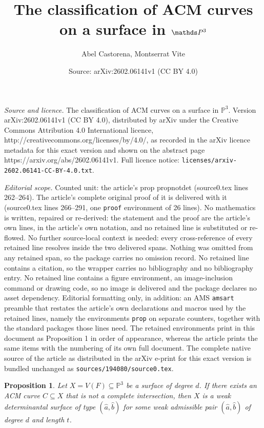 \documentclass[10pt,a4paper]{amsart}
\title{The classification of ACM curves on a surface in $\PPP$}
\author{Abel Castorena, Montserrat Vite}
\date{Source: arXiv:2602.06141v1 (CC BY 4.0)}
\newtheorem{prop}{Proposition}
\newcommand{\PP}{\mathds{P}}
\newcommand{\PPP}{\PP^{3}}
\begin{document}
\maketitle

\noindent\emph{Source and licence.} The classification of ACM curves on a surface in $\PPP$. Version arXiv:2602.06141v1 (CC BY 4.0), distributed by arXiv under the Creative Commons Attribution 4.0 International licence, http://creativecommons.org/licenses/by/4.0/, as recorded in the arXiv licence metadata for this exact version and shown on the abstract page https://arxiv.org/abs/2602.06141v1. Full licence notice: \texttt{licenses/arxiv-2602.06141-CC-BY-4.0.txt}.\par\smallskip

\noindent\textit{Editorial scope.} Counted unit: the article's prop propnotdet (source0.tex lines 262--264). The article's complete original proof of it is delivered with it (source0.tex lines 266--291, one \texttt{proof} environment of 26 lines). No mathematics is written, repaired or re-derived: the statement and the proof are the article's own lines, in the article's own notation, and no retained line is substituted or re-flowed.  No further source-local context is needed: every cross-reference of every retained line resolves inside the two delivered spans.  Nothing was omitted from any retained span, so the package carries no omission record.  No retained line contains a citation, so the wrapper carries no bibliography and no bibliography entry.  No retained line contains a figure environment, an image-inclusion command or drawing code, so no image is delivered and the package declares no asset dependency.  Editorial formatting only, in addition: an AMS \texttt{amsart} preamble that restates the article's own declarations and macros used by the retained lines, namely the environments \texttt{prop} on separate counters, together with the standard packages those lines need.  The retained environments print in this document as Proposition 1 in order of appearance, whereas the article prints the same items with the numbering of its own full document.  The complete native source of the article as distributed in the arXiv e-print for this exact version is bundled unchanged as \texttt{sources/194080/source0.tex}.
\begin{prop} \label{propnotdet}
Let $X=V(F)\subseteq \PPP$ be a surface of degree $d$. If there exists an ACM curve $C\subseteq X$ that is not a complete intersection, then $X$ is a weak determinantal surface of type $(\hat{a}, \hat{b})$ for some weak admissible pair $(\hat{a}, \hat{b})$ of degree $d$ and length $t$.
\end{prop}
\end{document}
